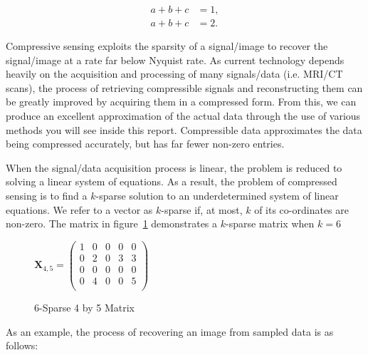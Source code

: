 \documentclass[titlepage,oneside, 12pt]{book}
\theoremstyle{break}
\begin{document}
\begin{equation}
\label{eq:UD}
\begin{split}
a + b + c &= 1,
\\
a + b + c &= 2.
\end{split}
\end{equation}


Compressive sensing exploits the sparsity of a signal/image to recover the signal/image at a rate far below Nyquist rate. As current technology depends heavily on the acquisition and processing of many signals/data (i.e. MRI/CT scans), the process of retrieving compressible signals and reconstructing them can be greatly improved by acquiring them in a compressed form. From this, we can produce an excellent approximation of the actual data through the use of various methods you will see inside this report. Compressible data approximates the data being compressed accurately, but has far fewer non-zero entries. 

When the signal/data acquisition process is linear, the problem is reduced to solving a linear system of equations. As a result, the problem of compressed sensing is to find a $k$-sparse solution to an underdetermined system of linear equations. We refer to a vector as $k$-sparse if, at most, $k$ of its co-ordinates are non-zero. The matrix in figure~\ref{fig:kSparse1} demonstrates a $k$-sparse matrix when $k = 6$



\begin{figure}[H]
\centering
$
\textbf{X}_{4,5} = \begin{pmatrix}
1 & 0 & 0 & 0 & 0 \\
0 & 2 & 0 & 3 & 3 \\
0 & 0 & 0 & 0 & 0 \\
0 & 4 & 0 & 0 & 5 \\
\end{pmatrix}
$
\caption{6-Sparse 4 by 5 Matrix}
\label{fig:kSparse1}
\end{figure}


\newpage

As an example, the process of recovering an image from sampled data is as follows: 
\end{document}
